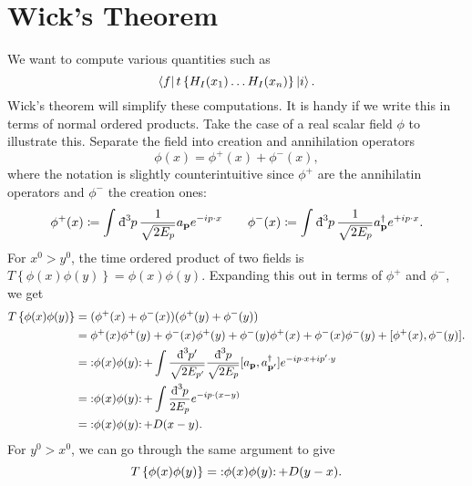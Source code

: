 
\section{Wick's Theorem}%
\label{sec:wick_s_theorem}

We want to compute various quantities such as 
\begin{equation}
  \bra{f} t \left\{ H_I (x_1) \dots H_I(x_n) \right\} \ket{i}.
\end{equation}
Wick's theorem will simplify these computations.
It is handy if we write this in terms of normal ordered products.
Take the case of a real scalar field $\phi$ to illustrate this.
Separate the field into creation and annihilation operators
\begin{equation}
  \phi(x) = \phi^+(x) + \phi^-(x),
\end{equation}
where the notation is slightly counterintuitive since $\phi^+$ are the annihilatin operators and $\phi^-$ the creation ones:
\begin{equation}
  \phi^+(x) \coloneqq \int_{}^{} \bdd[3]{p} \frac{1}{\sqrt{2 E_p}} a_{\vb{p}} e^{-ip \cdot x} \qquad
  \phi^-(x) \coloneqq \int_{}^{} \bdd[3]{p} \frac{1}{\sqrt{2 E_p}} a^{\dagger}_{\vb{p}} e^{+ip \cdot x}.
\end{equation}
For $x^0 > y^0$, the time ordered product of two fields is $T \left\{ \phi(x) \phi(y) \right\} = \phi(x) \phi(y)$.
Expanding this out in terms of $\phi^+$ and $\phi^-$, we get
\begin{align}
  T \left\{ \phi(x) \phi(y) \right\} &= (\phi^+(x) + \phi^-(x)) (\phi^+(y) + \phi^-(y)) \\
				     &=\phi^+(x) \phi^+(y) + \phi^-(x) \phi^+(y) + \phi^-(y) \phi^+(x) + \phi^-(x) \phi^-(y) + [\phi^+(x), \phi^-(y)]. \\
				     &= \normalorder{\phi(x) \phi(y) } + \int \frac{\bdd[3]{p'}}{\sqrt{2 E_{p'}}} \frac{\bdd[3]{p}}{\sqrt{2 E_p}} [a_{\vb{p}}, a_{\vb{p}'}^{\dagger}] e^{-i p \cdot x + i p' \cdot y} \\
				     &= \normalorder{\phi(x) \phi(y) } + \int \frac{\bdd[3]{p}}{2 E_p} e^{-ip \cdot (x - y)} \\
				     &= \normalorder{\phi(x) \phi(y) } + D(x - y).
\end{align}
For $y^0 > x^0$, we can go through the same argument to give
\begin{equation}
  T \left\{ \phi(x) \phi(y) \right\} = \normalorder{\phi(x) \phi(y) } + D(y - x).
\end{equation}
